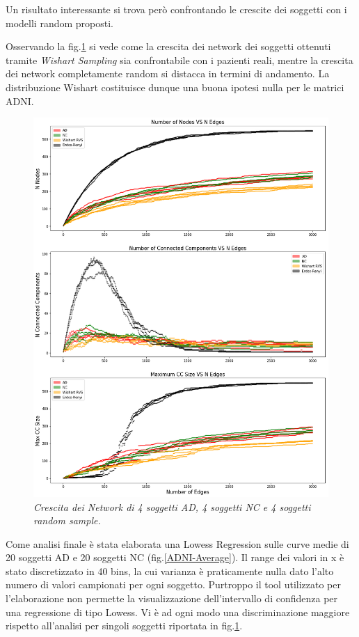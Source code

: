 \documentclass[12pt,openright,a4paper]{article}
\begin{document}
Un risultato interessante si trova però confrontando le crescite dei soggetti con i modelli random proposti. 

Osservando la fig.\ref{ADNI-ALL} si vede come la crescita dei network dei soggetti ottenuti tramite \textit{Wishart Sampling} sia confrontabile con i pazienti reali, mentre la crescita dei network completamente random si distacca in termini di andamento. La distribuzione Wishart costituisce dunque una buona ipotesi nulla per le matrici ADNI.

\begin{figure}[!h]
\centering
\includegraphics[scale=0.4]{ALL-Network-growthSMAD}
\caption{\textit{Crescita dei Network di 4 soggetti AD, 4 soggetti NC e 4 soggetti random sample. }}
\label{ADNI-ALL}
\end{figure}

Come analisi finale è stata elaborata una Lowess Regression sulle curve medie di 20 soggetti AD e 20 soggetti NC (fig.\ref{ADNI-Average}). Il range dei valori in x è stato discretizzato in 40 bins, la cui varianza è praticamente nulla dato l'alto numero di valori campionati per ogni soggetto.   Purtroppo il tool utilizzato per l'elaborazione non permette la visualizzazione dell'intervallo di confidenza per una regressione di tipo Lowess. Vi è ad ogni modo una discriminazione maggiore rispetto all'analisi per singoli soggetti riportata in fig.\ref{ADNI-ALL}.
\end{document}
